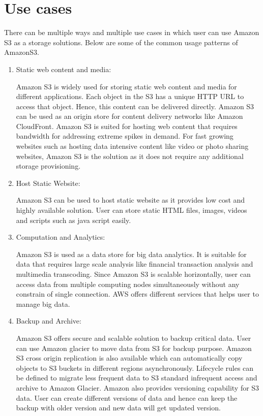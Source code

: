 \section{Use cases}
There can be multiple ways and multiple use cases in which user can use Amazon
S3 as a storage solutions. Below are some of the common usage patterns of
AmazonS3.
\begin{enumerate}
\item Static web content and media:

Amazon S3 is widely used for storing static web content and media for different
applications. Each object in the S3 has a
unique HTTP URL to access that object. Hence, this content can be delivered
directly. Amazon S3 can be
used as an origin store for content delivery networks like Amazon CloudFront.
Amazon S3 is suited for hosting web content that requires bandwidth for
addressing extreme spikes in demand. For fast growing websites such as hosting
data intensive content like video or photo sharing websites, Amazon S3 is the
solution as it does not require any additional storage provisioning.
 
\item Host Static Website:

Amazon S3 can be used to host static website as it
provides low cost and highly available solution. User can store static HTML
files, images, videos and scripts such as java script easily.

\item Computation and Analytics:

Amazon S3 is used as a data store for big data analytics. It is suitable for
data that requires large scale analysis like
financial transaction analysis and multimedia transcoding. Since Amazon S3 is
scalable horizontally, user can access data from multiple computing nodes
simultaneously without any constrain of single connection. AWS offers different
services that helps user to manage big data.

\item Backup and Archive:

Amazon S3 offers secure and scalable solution to
backup critical data. User can use Amazon glacier to move data from S3 for
backup purpose. Amazon S3 cross origin replication is also available which can
automatically copy objects to S3 buckets in different regions asynchronously.
Lifecycle rules can be defined to migrate less frequent data to S3 standard 
infrequent access and archive to Amazon Glacier. Amazon also provides
versioning capability for S3 data. User can create different versions of data
and hence can keep the backup with older version and new data will get updated
version.

\end{enumerate}

